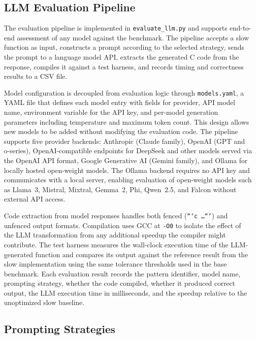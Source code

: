 \subsection{LLM Evaluation Pipeline}

The evaluation pipeline is implemented in \texttt{evaluate\_llm.py} and supports end-to-end assessment of any model against the benchmark. The pipeline accepts a slow function as input, constructs a prompt according to the selected strategy, sends the prompt to a language model API, extracts the generated C code from the response, compiles it against a test harness, and records timing and correctness results to a CSV file.

Model configuration is decoupled from evaluation logic through \texttt{models.yaml}, a YAML file that defines each model entry with fields for provider, API model name, environment variable for the API key, and per-model generation parameters including temperature and maximum token count. This design allows new models to be added without modifying the evaluation code. The pipeline supports five provider backends: Anthropic (Claude family), OpenAI (GPT and o-series), OpenAI-compatible endpoints for DeepSeek and other models served via the OpenAI API format, Google Generative AI (Gemini family), and Ollama for locally hosted open-weight models. The Ollama backend requires no API key and communicates with a local server, enabling evaluation of open-weight models such as Llama~3, Mistral, Mixtral, Gemma~2, Phi, Qwen~2.5, and Falcon without external API access.

Code extraction from model responses handles both fenced (\texttt{```c \ldots ```}) and unfenced output formats. Compilation uses GCC at \texttt{-O0} to isolate the effect of the LLM transformation from any additional speedup the compiler might contribute. The test harness measures the wall-clock execution time of the LLM-generated function and compares its output against the reference result from the slow implementation using the same tolerance thresholds used in the base benchmark. Each evaluation result records the pattern identifier, model name, prompting strategy, whether the code compiled, whether it produced correct output, the LLM execution time in milliseconds, and the speedup relative to the unoptimized slow baseline.

\subsection{Prompting Strategies}

